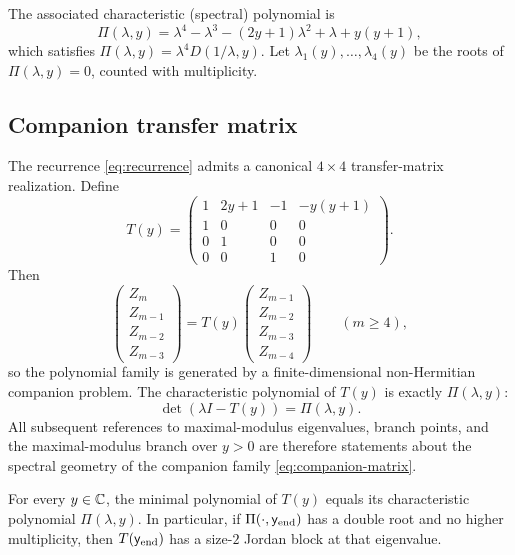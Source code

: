 The associated characteristic (spectral) polynomial is
\begin{equation}\label{eq:spectral-poly}
\Pi(\lambda,y)=\lambda^4-\lambda^3-(2y+1)\lambda^2+\lambda+y(y+1),
\end{equation}
which satisfies \(\Pi(\lambda,y)=\lambda^4 D(1/\lambda,y)\).
Let \(\lambda_1(y),\dots,\lambda_4(y)\) be the roots of \(\Pi(\lambda,y)=0\), counted with multiplicity.

\subsection{Companion transfer matrix}
\label{subsec:transfer-matrix}

The recurrence \eqref{eq:recurrence} admits a canonical $4\times 4$ transfer-matrix realization.
Define
\begin{equation}\label{eq:companion-matrix}
T(y)=
\begin{pmatrix}
1 & 2y+1 & -1 & -y(y+1)\\
1 & 0 & 0 & 0\\
0 & 1 & 0 & 0\\
0 & 0 & 1 & 0
\end{pmatrix}.
\end{equation}
Then
\[
\begin{pmatrix}
Z_m\\ Z_{m-1}\\ Z_{m-2}\\ Z_{m-3}
\end{pmatrix}
=
T(y)
\begin{pmatrix}
Z_{m-1}\\ Z_{m-2}\\ Z_{m-3}\\ Z_{m-4}
\end{pmatrix}
\qquad (m\ge 4),
\]
so the polynomial family is generated by a finite-dimensional non-Hermitian companion problem.
The characteristic polynomial of \(T(y)\) is exactly \(\Pi(\lambda,y)\):
\[
\det(\lambda I-T(y))=\Pi(\lambda,y).
\]
All subsequent references to maximal-modulus eigenvalues, branch points, and the maximal-modulus branch over $y>0$ are therefore statements about the spectral geometry of the companion family \eqref{eq:companion-matrix}.

\begin{lemma}\label{lem:cyclic-companion}
For every \(y\in\mathbb{C}\), the minimal polynomial of \(T(y)\) equals its characteristic polynomial \(\Pi(\lambda,y)\).
In particular, if \(\Pi(\cdot,\mathsf{y}_{\mathrm{end}})\) has a double root and no higher multiplicity, then \(T(\mathsf{y}_{\mathrm{end}})\) has a size-\(2\) Jordan block at that eigenvalue.
\end{lemma}

